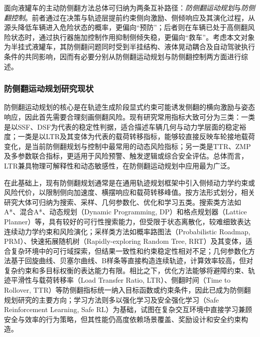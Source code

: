     面向液罐车的主动防侧翻方法总体可归纳为两条互补路径：\emph{防侧翻运动规划}与\emph{防侧翻控制}。前者通过在决策与轨迹层提前约束侧向激励、侧倾响应及其演化过程，从源头降低车辆进入危险状态的概率，更偏向“预防”；后者则在车辆已处于高侧翻风险状态时，通过执行器施加控制作用抑制侧倾失稳，更偏向“救车”。考虑本文对象为半挂式液罐车，其防侧翻问题同时受到半挂结构、液体晃动耦合及自动驾驶执行条件的共同影响，因而有必要分别从防侧翻运动规划与防侧翻控制两方面进行综述。

    \subsubsection{防侧翻运动规划研究现状}

      防侧翻运动规划的核心是在轨迹生成阶段显式约束可能诱发侧翻的横向激励与姿态响应，因此首先需要合理刻画侧翻风险。现有研究常用指标大致可分为三类：一类是以SSF、DSF为代表的稳定性判据，适合描述车辆几何与动力学层面的稳定裕度\cite{huston2014ssf,jin2007critical,heyuancha0_2010factor}；一类是以LTR及其变体为代表的载荷转移指标，能够较直接反映车轮接地载荷变化，是当前防侧翻规划与控制中最常用的动态风险指标\cite{zhang2016pulsed,zhao2019hinfty,jin2021heavytruck}；另一类是TTR、ZMP及多参数联合指标，更适用于风险预警、触发逻辑或综合安全评估\cite{wanying2020antirolover,zeng2017bpnn,jinliqiang2017yujing,jin2016tripped,jin2019triaxle,imine2015switched}。总体而言，LTR兼具物理可解释性和动态敏感性，在防侧翻运动规划中应用最为广泛。

      在此基础上，现有防侧翻规划通常是在通用轨迹规划框架中引入侧倾动力学约束或风险代价，以限制侧向加速度、横摆响应和载荷转移峰值。按方法形式划分，相关研究大体可归纳为搜索、采样、几何参数化、优化和学习五类。搜索类方法如A*、混合A*、动态规划（Dynamic Programming, DP）和格点规划器（Lattice Planner）等\cite{likhachev2009planning,kurzer2016hybrida,dong2023ecocruising,werling2010frenet}，具有较好的可行性搜索能力，但受限于状态离散化，较难细致表达连续动力学约束和风险演化；采样类方法如概率路图法（Probabilistic Roadmap, PRM）、快速拓展随机树（Rapidly-exploring Random Tree, RRT）及其变体\cite{kuwata2009realtime,karaman2011sampling,klemm2015rrtconnect,fan2024birrt}，适合复杂环境中的可行域探索，但结果一致性和约束稳定性相对不足；几何参数化方法基于回旋曲线、贝塞尔曲线、B样条等直接构造连续轨迹\cite{brezak2014clothoids,rastelli2014continuouscurvature,phanhuu2021bsplines,gotte2018splinebased,hegedus2020realtime}，计算效率较高，但对复杂约束和多目标权衡的表达能力有限。相比之下，优化方法能够将避障约束、轨迹平滑性与载荷转移率（Load Transfer Ratio, LTR）、侧翻时间（Time to Rollover, TTR）等防侧翻指标统一纳入目标函数或约束条件，因此已成为防侧翻规划研究的主要方向\cite{rasekhipour2017pfmpc,jin2021heavytruck,cheng2019longitudinal,li2019rollover,dong2023ecocruising}；学习方法则多以强化学习及安全强化学习（Safe Reinforcement Learning, Safe RL）为基础，试图在复杂交互环境中直接学习兼顾安全与效率的行为策略\cite{wu2024rlsurvey,zhang2023intersectionrl,irshayyid2024highwayrl,zhang2024saferl_tits,gu2024saferl_tpami,garcia2015saferl}，但其性能仍高度依赖场景覆盖、奖励设计和安全约束构造。

